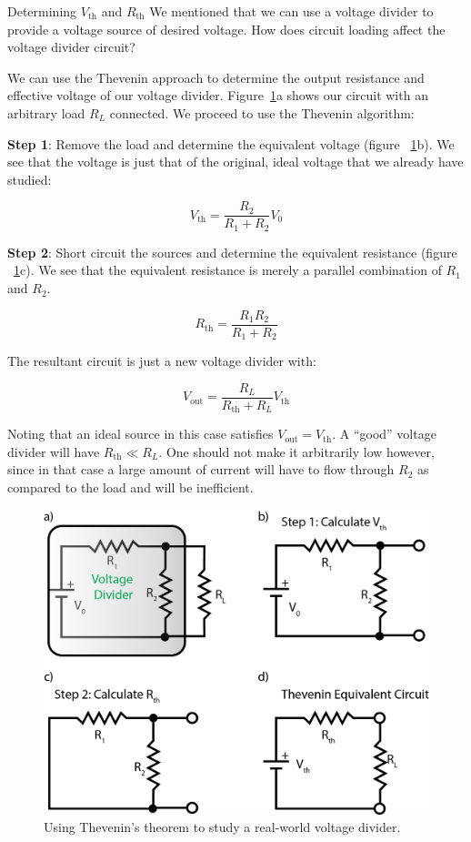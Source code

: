 \documentclass{tufte-book}
\begin{document}
\begin{myexample}[label = ex:thev_theo]{Determining $V_\text{th}$ and $R_\text{th}$}
We mentioned that we can use a voltage divider to provide a voltage source of desired voltage. How does circuit loading affect the voltage divider circuit?

\noindent We can use the Thevenin approach to determine the output resistance and effective voltage of our voltage divider. Figure~\ref{fig:thvn_ex_2}a shows our circuit with an arbitrary load $R_L$ connected. We proceed to use the Thevenin algorithm:

\noindent \textbf{Step 1}: Remove the load and determine the equivalent voltage (figure ~\ref{fig:thvn_ex_2}b). We see that the voltage is just that of the original, ideal voltage that we already have studied:

$$
V_\text{th} = \frac{R_2}{R_1+R_2}V_0
$$

\noindent \textbf{Step 2}: Short circuit the sources and determine the equivalent resistance (figure ~\ref{fig:thvn_ex_2}c). We see that the equivalent resistance is merely a parallel combination of $R_1$ and $R_2$.

$$
R_\text{th} = \frac{R_1R_2}{R_1+R_2}
$$

\noindent The resultant circuit is just a new voltage divider with:

$$
V_\text{out} = \frac{R_L}{R_\text{th}+R_L}V_\text{th}
$$

Noting that an ideal source in this case satisfies $V_\text{out} = V_\text{th}$. A ``good'' voltage divider will have $R_\text{th} \ll R_L$. One should not make it arbitrarily low however, since in that case a large amount of current will have to flow through $R_2$ as compared to the load and will be inefficient.
\end{myexample}

\begin{figure}[h]
\caption{Using Thevenin's theorem to study a real-world voltage divider.}
\label{fig:thvn_ex_2}
\begin{center}
\includegraphics[width=\textwidth]{thvn_ex_2.png}
\end{center}
\end{figure}
\end{document}
